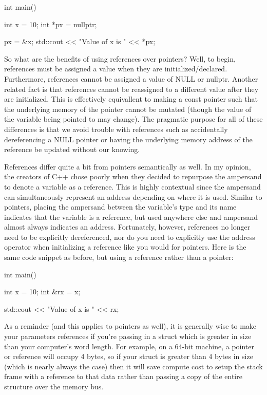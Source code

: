 \documentclass{article}
\begin{document}
\begin{cpplst}
    int main()
    {
        int x = 10;
        int *px = nullptr;

        px = &x;
        std::cout << "Value of x is " << *px;
    }
\end{cpplst}

So what are the benefits of using references over pointers? Well, to begin, references must be assigned a
value when they are initialized/declared. Furthermore, references cannot be assigned a value of NULL or
nullptr. Another related fact is that references cannot be reassigned to a different value after they are
initialized. This is effectively equivallent to making a const pointer such that the underlying memory of the
pointer cannot be mutated (though the value of the variable being pointed to may change). The pragmatic
purpose for all of these differences is that we avoid trouble with references such as accidentally
dereferencing a NULL pointer or having the underlying memory address of the reference be updated without our
knowing.

References differ quite a bit from pointers semantically as well. In my opinion, the creators of C++ chose
poorly when they decided to repurpose the ampersand to denote a variable as a reference. This is highly
contextual since the ampersand can simultaneously represent an address depending on where it is used. Similar
to pointers, placing the ampersand between the variable's type and its name indicates that the variable is a
reference, but used anywhere else and ampersand almost always indicates an address. Fortunately, however,
references no longer need to be explicitly dereferenced, nor do you need to explicitly use the address
operator when initializing a reference like you would for pointers. Here is the same code snippet as before,
but using a reference rather than a pointer:

\begin{cpplst}
    int main()
    {
        int x = 10;
        int &rx = x;

        std::cout << "Value of x is " << rx;
    }
\end{cpplst}

As a reminder (and this applies to pointers as well), it is generally wise to make your parameters references
if you're passing in a struct which is greater in size than your computer's word length. For example, on a
64-bit machine, a pointer or reference will occupy 4 bytes, so if your struct is greater than 4 bytes in size
(which is nearly always the case) then it will save compute cost to setup the stack frame with a reference to
that data rather than passing a copy of the entire structure over the memory bus.
\end{document}
